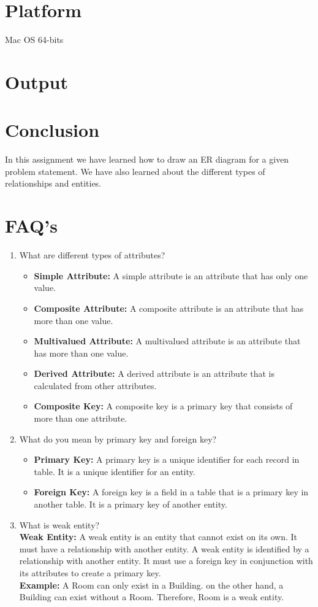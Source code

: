 \documentclass{article}
\begin{document}
\section{\textbf{Platform}}
Mac OS 64-bits
\section{\textbf{Output}}

\section{\textbf{Conclusion}}
In this assignment we have learned how to draw an ER diagram for a given problem statement. We have also learned about the different types of relationships and entities.
\section{\textbf{FAQ's}}
\begin{enumerate}
	\item What are different types of attributes?\\
	
	\begin{itemize}
		\item \textbf{Simple Attribute:} A simple attribute is an attribute that has only one value.
		\item \textbf{Composite Attribute:} A composite attribute is an attribute that has more than one value.
		\item \textbf{Multivalued Attribute:} A multivalued attribute is an attribute that has more than one value.
		\item \textbf{Derived Attribute:} A derived attribute is an attribute that is calculated from other attributes.
		\item \textbf{Composite Key:} A composite key is a primary key that consists of more than one attribute.
	\end{itemize}
	\item What do you mean by primary key and foreign key?
	
	\begin{itemize}
		\item \textbf{Primary Key:} A primary key is a unique identifier for each record in table. It is a unique identifier for an entity.
		\item \textbf{Foreign Key:} A foreign key is a field in a table that is a primary key in another table. It is a primary key of another entity.
	\end{itemize}
	\item What is weak entity?\\
	
	\textbf{Weak Entity:} A weak entity is an entity that cannot exist on its own. It must have a relationship with another entity. A weak entity is identified by a relationship with another entity. It must use a foreign key in conjunction with its attributes to create a primary key.\\
	
	\textbf{Example:} A Room can only exist in a Building. on the other hand, a Building can exist without a Room. Therefore, Room is a weak entity.
\end{enumerate}
\end{document}
